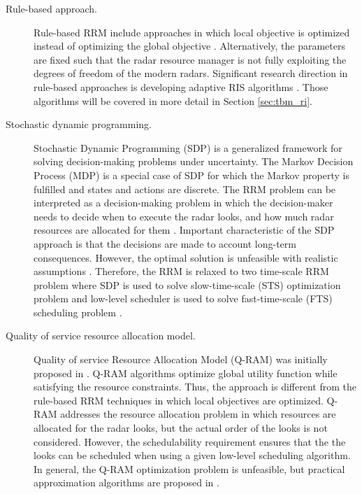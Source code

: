 \documentclass[english, 12pt, a4paper, elec, utf8, a-1b, online]{aaltothesis}
\begin{document}
\begin{description}

\item[Rule-based approach.]

Rule-based RRM include approaches in which local objective is optimized instead of optimizing the global objective \cite{Koch1999}.
Alternatively, the parameters are fixed such that the radar resource manager is not fully exploiting the degrees of freedom of the modern radars.
Significant research direction in rule-based approaches is developing adaptive RIS algorithms \cite{Cohen1986, Gardner1988, Munu1992, ChengTing2007, Baek2010, Watson1993, Charlish2015, Keuk1975, Shin1995, Benoudnine2006}. Those algorithms will be covered in more detail in Section \ref{sec:tbm_ri}.


\item[Stochastic dynamic programming.]

Stochastic Dynamic Programming (SDP) is a generalized framework for solving decision-making problems under uncertainty. 
The  Markov Decision Process (MDP) is a special case of SDP for which the Markov property is fulfilled and states and actions are discrete.
The RRM problem can be interpreted as a decision-making problem in which the decision-maker needs to decide when to execute the radar looks, and how much radar resources are allocated for them \cite{Krishnamurthy1999, Krishnamurthy2001, Wintenby2006, LaScala2006}.
Important characteristic of the SDP approach is that the decisions are made to account long-term consequences.
However, the optimal solution is unfeasible with realistic assumptions \cite{Wintenby2006}.
Therefore, the RRM is relaxed to two time-scale RRM problem where SDP is used to solve slow-time-scale (STS) optimization problem and low-level scheduler is used to solve fast-time-scale (FTS) scheduling problem \cite{Wintenby2006}.  


\item[Quality of service resource allocation model.] 

Quality of service Resource Allocation Model (Q-RAM) was initially proposed in \cite{Rajkumar1997}.
Q-RAM algorithms optimize global utility function while satisfying the resource constraints.
Thus, the approach is different from the rule-based RRM techniques in which local objectives are optimized.
Q-RAM addresses the resource allocation problem in which resources are allocated for the radar looks, but the actual order of the looks is not considered.
However, the schedulability requirement ensures that the the looks can be scheduled when using a given low-level scheduling algorithm. 
In general, the Q-RAM optimization problem is unfeasible, but practical approximation algorithms are proposed in \cite{Rajkumar1998, Irci2010, Charlish2015a}.


\end{description}
\end{document}
